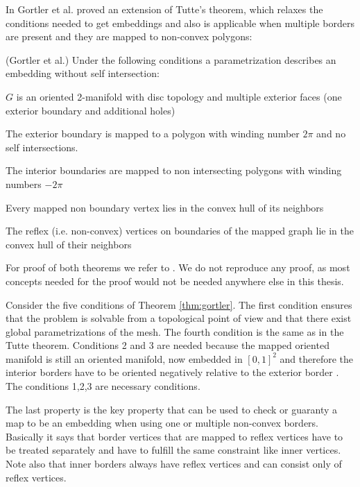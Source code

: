 In \note{[...]} Gortler et al. proved an extension of Tutte's theorem, which relaxes the conditions needed to get embeddings and also is applicable when multiple borders are present and they are mapped to non-convex polygons:

\begin{thm}\label{thm:gortler}(Gortler et al.) Under the following conditions a parametrization describes an embedding without self intersection:
\begin{packed_enum}
\item $G$ is an oriented 2-manifold with disc topology and multiple exterior faces (one exterior boundary and additional holes)
\item The exterior boundary is mapped to a polygon with winding number $2\pi$ and no self intersections.
\item The interior boundaries are mapped to non intersecting polygons with winding numbers $-2\pi$
\item Every mapped non boundary vertex lies in the convex hull of its neighbors
\item The reflex (i.e. non-convex) vertices on boundaries of the mapped graph lie in the convex hull of their neighbors
\end{packed_enum}
\end{thm}
For proof of both theorems we refer to . We do not reproduce any proof, as most concepts needed for the proof would not be needed anywhere else in this thesis.

Consider the five conditions of Theorem \ref{thm:gortler}. The first condition ensures that the problem is solvable from a topological point of view and that there exist global parametrizations of the mesh. The fourth condition is the same as in the Tutte theorem. Conditions 2 and 3 are needed because the mapped oriented manifold is still an oriented manifold, now embedded in $[0,1]^2$ and therefore the interior borders  have to be oriented negatively relative to the exterior border . The conditions 1,2,3 are necessary conditions. 

The last property is the key property that can be used to check or guaranty a map to be an embedding when using one or multiple non-convex borders. Basically it says that border vertices that are mapped to reflex vertices have to be treated separately and have to fulfill the same constraint like inner vertices. Note also that inner borders always have reflex vertices  and can consist only of reflex vertices.


